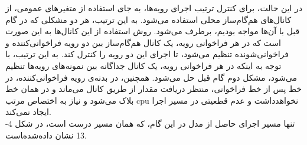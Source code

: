 در این حالت، برای کنترل ترتیب اجرای رویه‌ها، به جای استفاده از متغیرهای عمومی، از کانال‌های هم‌گام‌ساز محلی استفاده می‌شود. به این ترتیب، هر دو مشکلی که در گام قبل با آن‌ها مواجه بودیم، برطرف می‌شود. روش استفاده از این کانال‌ها به این صورت است که در هر فراخوانی رویه، یک کانال هم‌گام‌ساز بین دو رویه فراخوانی‌کننده و فراخوانی‌شونده تنظیم می‌شود، تا اجرای این دو رویه را کنترل کند. به این ترتیب، با توجه به اینکه در هر فراخوانی رویه، یک کانال جداگانه بین نمونه‌های رویه‌ها تنظیم می‌شود، مشکل دوم گام قبل حل می‌شود. همچنین، در بدنه‌ی رویه فراخوانی‌کننده، در خط پس از خط فراخوانی، منتظر دریافت مقدار از طریق کانال می‌ماند و در همان خط بلاک می‌شود و نیاز به اختصاص مرتب cpu  نخواهدداشت و عدم قطعیتی در مسیر اجرا ایجاد نمی‌کند.
\\
تنها مسیر اجرای حاصل از مدل در این گام، که همان مسیر درست است، در شکل 4-13 نشان ‌داده‌شده‌‍است.

